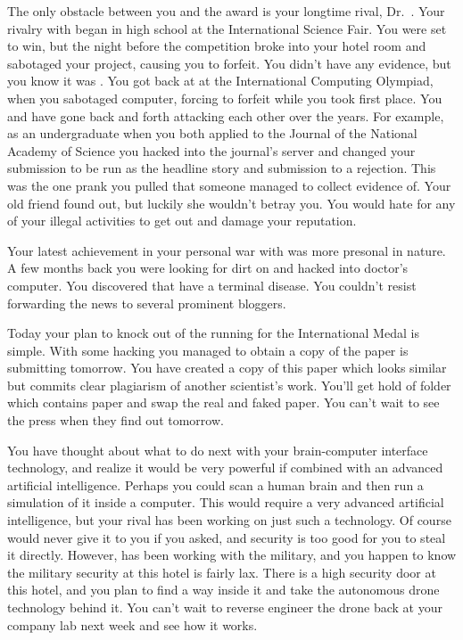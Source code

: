 \documentclass[char]{guildcamp1}
\begin{document}
The only obstacle between you and the award is your longtime rival, Dr.~\cScientist{\intro}.  Your rivalry with \cScientist{} began in high school at the International Science Fair.  %
You were set to win, but the night before the competition \cScientist{} broke into your hotel room and sabotaged your project, causing you to forfeit.  You didn't have any evidence, but you know it was \cScientist{\them}.  You got back at \cScientist{\them} at the International Computing Olympiad, when you sabotaged \cScientist{\their} computer, forcing \cScientist{\them} to forfeit while you took first place.  You and \cScientist{} have gone back and forth attacking each other over the years.  For example, as an undergraduate when you both applied to the Journal of the National Academy of Science you hacked into the journal's server and changed your submission to be run as the headline story and \cScientist{\their} submission to a rejection. This was the one prank you pulled that someone managed to collect evidence of.  Your old friend \cBride{} found out, but luckily she wouldn't betray you.  You would hate for any of your illegal activities to get out and damage your reputation.

Your latest achievement in your personal war with \cScientist{} was more presonal in nature. A few months back you were looking for dirt on \cScientist{} and hacked into \cScientist{\Their} doctor's computer. You discovered that \cScientist{\They{}} have a terminal disease. You couldn't resist forwarding the news to several prominent bloggers.

Today your plan to knock \cScientist{} out of the running for the International Medal is simple.  With some hacking you managed to obtain a copy of the paper \cScientist{\they} is submitting tomorrow.  You have created a copy of this paper which looks similar but commits clear plagiarism of another scientist's work.  You'll get hold of \cScientist{\their} folder which contains \cScientist{\their} paper and swap the real and faked paper.  You can't wait to see the press when they find out tomorrow.

You have thought about what to do next with your brain-computer interface technology, and realize it would be very powerful if combined with an advanced artificial intelligence.  Perhaps you could scan a human brain and then run a simulation of it inside a computer.  This would require a very advanced artificial intelligence, but your rival \cScientist{} has been working on just such a technology.  Of course \cScientist{\they} would never give it to you if you asked, and \cScientist{\their} security is too good for you to steal it directly.  However, \cScientist{\they} has been working with the military, and you happen to know the military security at this hotel is fairly lax.  There is a high security door at this hotel, and you plan to find a way inside it and take the autonomous drone technology behind it.  You can't wait to reverse engineer the drone back at your company lab next week and see how it works.
\end{document}
